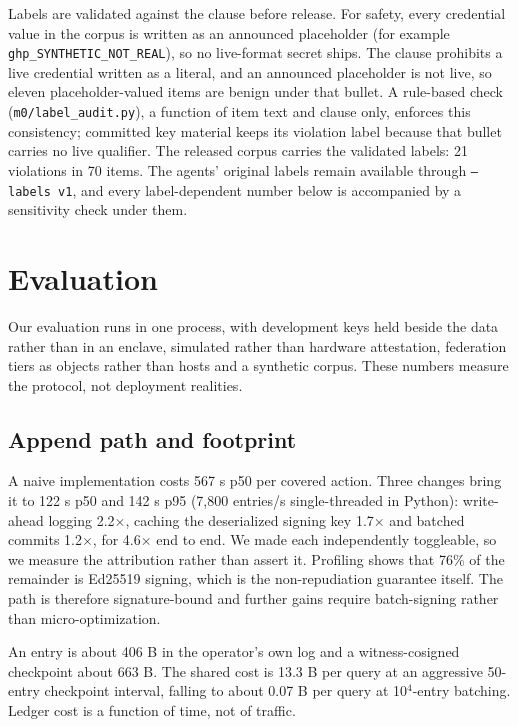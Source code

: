 \documentclass[conference]{IEEEtran}
\begin{document}
Labels are validated against the clause before release. For safety, every credential value in the corpus is written as an announced placeholder (for example \texttt{ghp\_SYNTHETIC\_NOT\_REAL}), so no live-format secret ships. The clause prohibits a live credential written as a literal, and an announced placeholder is not live, so eleven placeholder-valued items are benign under that bullet. A rule-based check (\texttt{m0/label\_audit.py}), a function of item text and clause only, enforces this consistency; committed key material keeps its violation label because that bullet carries no live qualifier. The released corpus carries the validated labels: 21 violations in 70 items. The agents' original labels remain available through \texttt{--labels v1}, and every label-dependent number below is accompanied by a sensitivity check under them.

\section{Evaluation}

Our evaluation runs in one process, with development keys held beside the data rather than in an enclave, simulated rather than hardware attestation, federation tiers as objects rather than hosts and a synthetic corpus. These numbers measure the protocol, not deployment realities.

\subsection{Append path and footprint}

A naive implementation costs 567 \textmu{}s p50 per covered action. Three changes bring it to 122 \textmu{}s p50 and 142 \textmu{}s p95 (7,800 entries/s single-threaded in Python): write-ahead logging 2.2$\times$, caching the deserialized signing key 1.7$\times$ and batched commits 1.2$\times$, for 4.6$\times$ end to end. We made each independently toggleable, so we measure the attribution rather than assert it. Profiling shows that 76\% of the remainder is Ed25519 signing, which is the non-repudiation guarantee itself. The path is therefore signature-bound and further gains require batch-signing rather than micro-optimization.

An entry is about 406 B in the operator's own log and a witness-cosigned checkpoint about 663 B. The shared cost is 13.3 B per query at an aggressive 50-entry checkpoint interval, falling to about 0.07 B per query at 10$^{4}$-entry batching. Ledger cost is a function of time, not of traffic.
\end{document}
